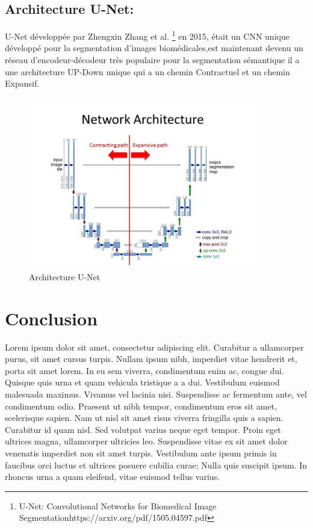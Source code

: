 \subsection{Architecture U-Net: }
U-Net développée par Zhengxin Zhang et al.
\footnote{U-Net: Convolutional Networks for Biomedical Image Segmentation\newline https://arxiv.org/pdf/1505.04597.pdf} en 2015, était un CNN unique développé pour la segmentation d'images biomédicales,est maintenant devenu un réseau d'encodeur-décodeur très populaire pour la segmentation sémantique il a une architecture UP-Down unique qui a un chemin Contractuel et un chemin Expansif.
\vspace{10pt}
\begin{figure}[htp]
    \centering
    \includegraphics[width=10cm]{Chapiters/Chapiter_03/Pictures/unet.jpg}
    \caption{Architecture U-Net}
    \label{unet}
\end{figure}
\newpage
\section{Conclusion}
Lorem ipsum dolor sit amet, consectetur adipiscing elit. Curabitur a ullamcorper purus, sit amet cursus turpis. Nullam ipsum nibh, imperdiet vitae hendrerit et, porta sit amet lorem. In eu sem viverra, condimentum enim ac, congue dui. Quisque quis urna et quam vehicula tristique a a dui. Vestibulum euismod malesuada maximus. Vivamus vel lacinia nisi. Suspendisse ac fermentum ante, vel condimentum odio. Praesent ut nibh tempor, condimentum eros sit amet, scelerisque sapien. Nam ut nisl sit amet risus viverra fringilla quis a sapien. Curabitur id quam nisl. Sed volutpat varius neque eget tempor. Proin eget ultrices magna, ullamcorper ultricies leo. Suspendisse vitae ex sit amet dolor venenatis imperdiet non sit amet turpis. Vestibulum ante ipsum primis in faucibus orci luctus et ultrices posuere cubilia curae; Nulla quis suscipit ipsum. In rhoncus urna a quam eleifend, vitae euismod tellus varius. 
